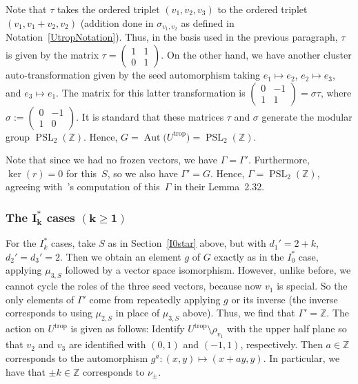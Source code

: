 \documentclass[10pt,a4paper]{amsart}
\numberwithin{equation}{section}
\numberwithin{figure}{section}
\numberwithin{table}{section}
\DeclareMathOperator{\PSL}{PSL}
\DeclareMathOperator{\trop}{trop}
\DeclareMathOperator{\Aut}{Aut}
\let\bb=\mathbb
\theoremstyle{definition}
\begin{document}
Note that $\tau$ takes the ordered triplet $(v_1,v_2,v_3)$ to the ordered triplet $(v_1,v_1+v_2, v_2)$ (addition done in $\sigma_{v_1,v_2}$ as defined in Notation~\ref{UtropNotation}). Thus, in the basis used in the previous paragraph, $\tau$ is given by the matrix $\tau=\left(\begin{smallmatrix} 1 & 1 \\ 0 & 1\end{smallmatrix}\right)$. On the other hand, we have another cluster auto-transformation given by the seed automorphism taking $e_1\mapsto e_2$, $e_2\mapsto e_3$, and $e_3\mapsto e_1$. The matrix for this latter transformation is $\left(\begin{smallmatrix} 0 & -1 \\ 1 & 1\end{smallmatrix}\right)=\sigma \tau$, where $\sigma:=\left(\begin{smallmatrix} 0 & -1 \\ 1 & 0\end{smallmatrix}\right)$. It is standard that these matrices $\tau$ and $\sigma$ generate the modular group $\PSL_2(\bb{Z})$. Hence, $G=\Aut\big(U^{\trop}\big)=\PSL_2(\bb{Z})$.
		
Note that since we had no frozen vectors, we have $\Gamma=\Gamma'$. Furthermore, $\ker(r)=0$ for this~$S$, so we also have $\Gamma'=G$. Hence, $\Gamma=\PSL_2(\bb{Z})$, agreeing with~\cite{FG1}'s computation of this~$\Gamma$ in their Lemma~2.32.

\subsubsection[The $I_k^*$ cases $(k\geq 1)$]{The $\boldsymbol{I_k^*}$ cases $\boldsymbol{(k\geq 1)}$}

For the $I_k^*$ cases, take $S$ as in Section~\ref{I0star} above, but with $d_1'=2+k$, $d_2'=d_3'=2$. Then we obtain an element $g$ of $G$ exactly as in the $I_0^*$ case, applying $\mu_{3,S}$ followed by a vector space isomorphism. However, unlike before, we cannot cycle the roles of the three seed vectors, because now $v_1$ is special. So the only elements of $\Gamma'$ come from repeatedly applying $g$ or its inverse (the inverse corresponds to using $\mu_{2,S}$ in place of $\mu_{3,S}$ above). Thus, we find that $\Gamma'=\bb{Z}$. The action on $U^{\trop}$ is given as follows: Identify $U^{\trop}\setminus \rho_{v_1}$ with the upper half plane so that $v_2$ and $v_3$ are identified with $(0,1)$ and $(-1,1)$, respectively. Then $a\in \bb{Z}$ corresponds to the automorphism $g^a\colon (x,y)\mapsto (x+ay,y)$. In particular, we have that $\pm k\in \bb{Z}$ corresponds to $\nu_{\pm}$.
\end{document}
